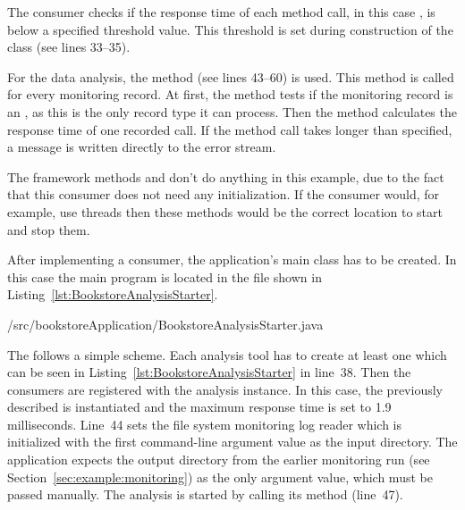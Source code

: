 \setJavaCodeListing       



\noindent The consumer checks if the response time of each method call, in this case , is below %
a specified threshold value. %
This threshold is set during construction of the  class (see lines 33--35). 


For the data analysis, the method  (see lines 43--60) is used. %
This method is called for every monitoring record. At first, the method tests if %
the monitoring record is an , as %
this is the only record type it can process. Then the method calculates the %
response time of one recorded  call. If the method call takes %
longer than specified, a message is written directly to the error stream.

The framework methods  and  don't do anything %
in this example, due to the fact that this consumer does not need any initialization. %
If the consumer would, for example, use threads then these methods would be the %
correct location to start and stop them.

After implementing a consumer, the application's main class has to be created. %
In this case the main program is located in the  %
file shown in Listing~\ref{lst:BookstoreAnalysisStarter}.

\setJavaCodeListing       
%
{\manualInstrumentedBookstoreApplicationDir/src/bookstoreApplication/BookstoreAnalysisStarter.java}

\noindent The  follows a simple scheme. Each %
analysis tool has to create at least one  which can be %
seen in Listing~\ref{lst:BookstoreAnalysisStarter} in line~38. Then the consumers %
are registered with the analysis instance. In this case, the previously described %
 is instantiated and the maximum response time is set to 1.9 milliseconds. %
Line~44 sets the file system monitoring log reader which is initialized with the first %
command-line argument value as the input directory. The application expects the %
output directory from the earlier monitoring run (see Section~\ref{sec:example:monitoring}) %
as the only argument value, which must be passed manually. %
The analysis is started by calling its  method (line~47). %

